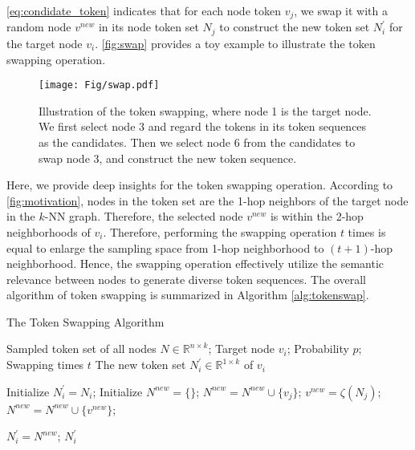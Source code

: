 \autoref{eq:condidate_token} indicates that for each node token $v_j$, we swap it with a random node $v^{new}$ in its node token set $N_j$ to construct the new token set $N^{\prime}_i$ for the target node $v_i$.
\autoref{fig:swap} provides a toy example to illustrate the token swapping operation.


\begin{figure}[t]
\centering
\texttt{[image: Fig/swap.pdf]}
\caption{
Illustration of the token swapping, where node 1 is the target node. We first select node 3 and regard the tokens in its token sequences as the candidates.
Then we select node 6 from the candidates to swap node 3, and construct the new token sequence.
}
\label{fig:swap}
\end{figure}


Here, we provide deep insights for the token swapping operation.
According to \autoref{fig:motivation}, nodes in the token set are the 1-hop neighbors of the target node in the $k$-NN graph.
Therefore, the selected node $v^{new}$ is within the 2-hop neighborhoods of $v_i$.
Therefore, performing the swapping operation $t$ times is equal to enlarge the sampling space from 1-hop neighborhood to $(t+1)$-hop neighborhood.
Hence, the swapping operation effectively utilize the semantic relevance between nodes to generate diverse token sequences.
The overall algorithm of token swapping is summarized in Algorithm \ref{alg:tokenswap}.

\begin{algorithm}[tb]
   \caption{The Token Swapping Algorithm}
   \label{alg:tokenswap}
\begin{algorithmic}[1]
   \REQUIRE Sampled token set of all nodes $N\in \mathbb{R}^{n\times k}$; Target node $v_i$; Probability $p$; Swapping times $t$
   \ENSURE The new token set $N^{\prime}_i\in \mathbb{R}^{1\times k}$ of $v_i$

    \STATE Initialize $N^{\prime}_i=N_i$;
    \STATE Initialize $N^{new}=\{\}$;
   \STATE $N^{new}=N^{new}\cup\{v_j\}$;
    \ELSE
    \STATE $v^{new}= \zeta(N_j)$;
    \STATE $N^{new}=N^{new}\cup\{v^{new}\}$;

   \ENDIF
   \ENDFOR
   \STATE $N^{\prime}_i = N^{new}$;
   \ENDFOR
   \RETURN $N^{\prime}_i$

\end{algorithmic}
\end{algorithm}

